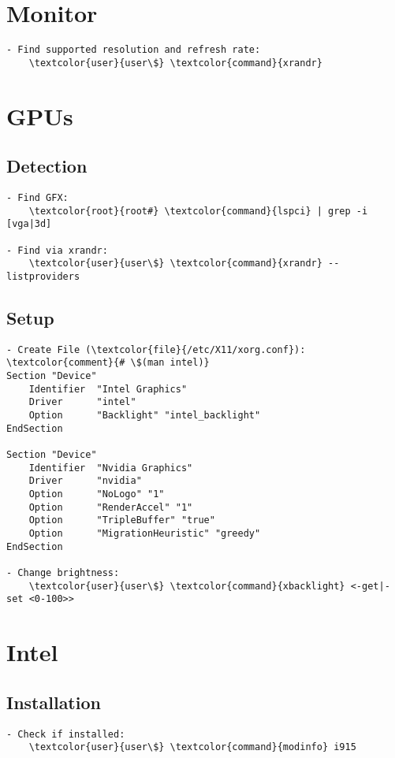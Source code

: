 \documentclass[10pt, a4paper, onecolumn, openany]{book} %
\begin{document}
\section{Monitor}
\begin{Verbatim}[commandchars=\\\{\}]
- Find supported resolution and refresh rate:
    \textcolor{user}{user\$} \textcolor{command}{xrandr}
\end{Verbatim}

\section{GPUs}
\subsection{Detection}
\begin{Verbatim}[commandchars=\\\{\}]
- Find GFX:
    \textcolor{root}{root#} \textcolor{command}{lspci} | grep -i [vga|3d]
    
- Find via xrandr:
    \textcolor{user}{user\$} \textcolor{command}{xrandr} --listproviders
\end{Verbatim}
\subsection{Setup}
\begin{Verbatim}[commandchars=\\\{\}]
- Create File (\textcolor{file}{/etc/X11/xorg.conf}):
\textcolor{comment}{# \$(man intel)}
Section "Device"
    Identifier  "Intel Graphics"
    Driver      "intel"
    Option      "Backlight" "intel_backlight"
EndSection

Section "Device"
    Identifier  "Nvidia Graphics"
    Driver      "nvidia"
    Option      "NoLogo" "1"
    Option      "RenderAccel" "1"
    Option      "TripleBuffer" "true"
    Option      "MigrationHeuristic" "greedy"
EndSection

- Change brightness:
    \textcolor{user}{user\$} \textcolor{command}{xbacklight} <-get|-set <0-100>>
\end{Verbatim}

\section{Intel}
\subsection{Installation}
\begin{Verbatim}[commandchars=\\\{\}]
- Check if installed:
    \textcolor{user}{user\$} \textcolor{command}{modinfo} i915
\end{Verbatim}
\end{document}
